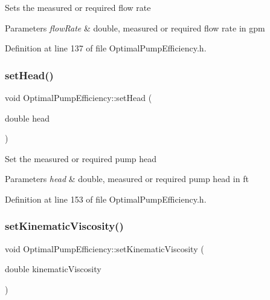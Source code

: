 Sets the measured or required flow rate 
\begin{DoxyParams}{Parameters}
{\em flow\+Rate} & double, measured or required flow rate in gpm \\
\hline
\end{DoxyParams}


Definition at line 137 of file Optimal\+Pump\+Efficiency.\+h.

\mbox{\label{class_optimal_pump_efficiency_ac317c900ec68797cf051977147ea33da}} 
\subsubsection{\texorpdfstring{set\+Head()}{setHead()}}
{\footnotesize\ttfamily void Optimal\+Pump\+Efficiency\+::set\+Head (\begin{DoxyParamCaption}\item[{double}]{head }\end{DoxyParamCaption})\hspace{0.3cm}{\ttfamily [inline]}}

Set the measured or required pump head 
\begin{DoxyParams}{Parameters}
{\em head} & double, measured or required pump head in ft \\
\hline
\end{DoxyParams}


Definition at line 153 of file Optimal\+Pump\+Efficiency.\+h.

\mbox{\label{class_optimal_pump_efficiency_a00017e0bd100beb2f4b0bf2db5e3687f}} 
\subsubsection{\texorpdfstring{set\+Kinematic\+Viscosity()}{setKinematicViscosity()}}
{\footnotesize\ttfamily void Optimal\+Pump\+Efficiency\+::set\+Kinematic\+Viscosity (\begin{DoxyParamCaption}\item[{double}]{kinematic\+Viscosity }\end{DoxyParamCaption})\hspace{0.3cm}{\ttfamily [inline]}}

